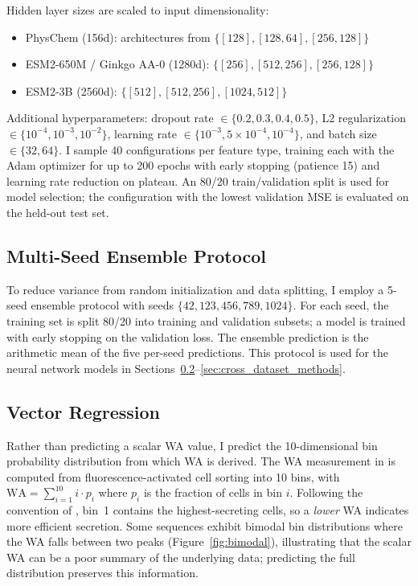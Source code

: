 \documentclass[12pt]{article}
\begin{document}
Hidden layer sizes are scaled to input dimensionality:
\begin{itemize}
    \item PhysChem (156d): architectures from $\{[128], [128, 64], [256, 128]\}$
    \item ESM2-650M / Ginkgo AA-0 (1280d): $\{[256], [512, 256], [256, 128]\}$
    \item ESM2-3B (2560d): $\{[512], [512, 256], [1024, 512]\}$
\end{itemize}

Additional hyperparameters: dropout rate $\in \{0.2, 0.3, 0.4, 0.5\}$, L2 regularization $\in \{10^{-4}, 10^{-3}, 10^{-2}\}$, learning rate $\in \{10^{-3}, 5\times10^{-4}, 10^{-4}\}$, and batch size $\in \{32, 64\}$.
I sample 40 configurations per feature type, training each with the Adam optimizer for up to 200 epochs with early stopping (patience 15) and learning rate reduction on plateau.
An 80/20 train/validation split is used for model selection; the configuration with the lowest validation MSE is evaluated on the held-out test set.

\subsection{Multi-Seed Ensemble Protocol}
\label{sec:ensemble}

To reduce variance from random initialization and data splitting, I employ a 5-seed ensemble protocol with seeds $\{42, 123, 456, 789, 1024\}$.
For each seed, the training set is split 80/20 into training and validation subsets; a model is trained with early stopping on the validation loss.
The ensemble prediction is the arithmetic mean of the five per-seed predictions.
This protocol is used for the neural network models in Sections~\ref{sec:vector}--\ref{sec:cross_dataset_methods}.

\subsection{Vector Regression}
\label{sec:vector}

Rather than predicting a scalar WA value, I predict the 10-dimensional bin probability distribution from which WA is derived.
The WA measurement in \citet{grasso2023} is computed from fluorescence-activated cell sorting into 10 bins, with $\text{WA} = \sum_{i=1}^{10} i \cdot p_i$ where $p_i$ is the fraction of cells in bin $i$. Following the convention of \citet{grasso2023}, bin~1 contains the highest-secreting cells, so a \emph{lower} WA indicates more efficient secretion.
Some sequences exhibit bimodal bin distributions where the WA falls between two peaks (Figure~\ref{fig:bimodal}), illustrating that the scalar WA can be a poor summary of the underlying data; predicting the full distribution preserves this information.
\end{document}
